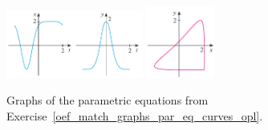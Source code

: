 \begin{Answer}
\begin{figure}[H]
{    }
    \centerline{
    \includegraphics[width=0.4\textwidth]{fig_match_graphs_par_eq_d}
    \hspace{1cm} 
    \includegraphics[width=0.2\textwidth]{fig_match_graphs_par_curve_II}
    }
    \caption{Graphs of the parametric equations from Exercise~\ref{oef_match_graphs_par_eq_curves_opl}.}
    \label{fig_par_eqs_graphs}
    \end{figure}
\end{Answer}


